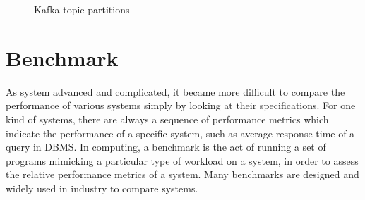 \begin{figure}
  \begin{center}
   \caption{Kafka topic partitions}
   \label{fig:kafka_partitioned_topic}
  \end{center}
\end{figure}

\section{Benchmark}
\label{section:benchmark}

As system advanced and complicated, it became more difficult to compare the performance of various systems simply by looking at their specifications. For one kind of systems, there are always a sequence of performance metrics which indicate the performance of a specific system, such as average response time of a query in DBMS. In computing, a benchmark is the act of running a set of programs mimicking a particular type of workload on a system, in order to assess the relative performance metrics of a system. Many benchmarks are designed and widely used in industry to compare systems.

